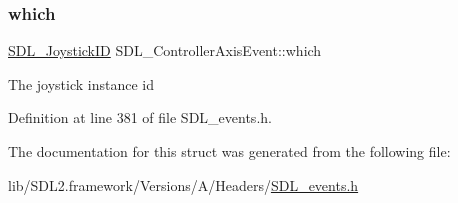 \mbox{\label{struct_s_d_l___controller_axis_event_a07087f68ea9d64b50047d65312ee7b94}} 
\subsubsection{\texorpdfstring{which}{which}}
{\footnotesize\ttfamily \mbox{\hyperlink{_s_d_l__joystick_8h_a3c3d32500cb08f76ee8077983912c0bd}{S\+D\+L\+\_\+\+Joystick\+ID}} S\+D\+L\+\_\+\+Controller\+Axis\+Event\+::which}

The joystick instance id 

Definition at line 381 of file S\+D\+L\+\_\+events.\+h.



The documentation for this struct was generated from the following file\+:\begin{DoxyCompactItemize}
\item 
lib/\+S\+D\+L2.\+framework/\+Versions/\+A/\+Headers/\mbox{\hyperlink{_s_d_l__events_8h}{S\+D\+L\+\_\+events.\+h}}\end{DoxyCompactItemize}

